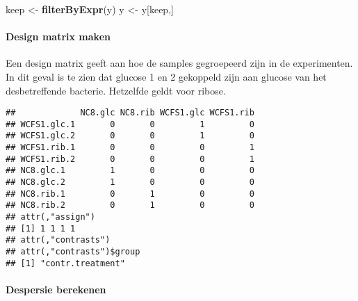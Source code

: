 \documentclass[
]{article}
\newenvironment{Shaded}{\begin{snugshade}}{\end{snugshade}}
\newcommand{\DataTypeTok}[1]{\textcolor[rgb]{0.13,0.29,0.53}{#1}}
\newcommand{\DecValTok}[1]{\textcolor[rgb]{0.00,0.00,0.81}{#1}}
\newcommand{\KeywordTok}[1]{\textcolor[rgb]{0.13,0.29,0.53}{\textbf{#1}}}
\newcommand{\NormalTok}[1]{#1}
\newcommand{\OperatorTok}[1]{\textcolor[rgb]{0.81,0.36,0.00}{\textbf{#1}}}
\newcommand{\StringTok}[1]{\textcolor[rgb]{0.31,0.60,0.02}{#1}}
\begin{document}
\begin{Shaded}
\begin{Highlighting}[]
\NormalTok{keep <-}\StringTok{ }\KeywordTok{filterByExpr}\NormalTok{(y)}
\NormalTok{y <-}\StringTok{ }\NormalTok{y[keep,]}
\end{Highlighting}
\end{Shaded}

\hypertarget{design-matrix-maken}{%
\paragraph{Design matrix maken}\label{design-matrix-maken}}

Een design matrix geeft aan hoe de samples gegroepeerd zijn in de
experimenten. In dit geval is te zien dat glucose 1 en 2 gekoppeld zijn
aan glucose van het desbetreffende bacterie. Hetzelfde geldt voor
ribose.

\begin{Shaded}
\end{Shaded}

\begin{verbatim}
##             NC8.glc NC8.rib WCFS1.glc WCFS1.rib
## WCFS1.glc.1       0       0         1         0
## WCFS1.glc.2       0       0         1         0
## WCFS1.rib.1       0       0         0         1
## WCFS1.rib.2       0       0         0         1
## NC8.glc.1         1       0         0         0
## NC8.glc.2         1       0         0         0
## NC8.rib.1         0       1         0         0
## NC8.rib.2         0       1         0         0
## attr(,"assign")
## [1] 1 1 1 1
## attr(,"contrasts")
## attr(,"contrasts")$group
## [1] "contr.treatment"
\end{verbatim}

\hypertarget{despersie-berekenen}{%
\paragraph{Despersie berekenen}\label{despersie-berekenen}}
\end{document}
